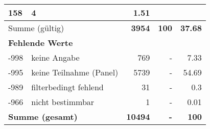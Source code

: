 \begin{longtable}{lXrrr}
       \num{158} &
       \num[round-mode=places,round-precision=2]{4} &
         \num[round-mode=places,round-precision=2]{1,51} \\
     \midrule
     \multicolumn{2}{l}{Summe (gültig)} &
       \textbf{\num{3954}} &
     \textbf{100} &
       \textbf{\num[round-mode=places,round-precision=2]{37,68}} \\
     \multicolumn{5}{l}{\textbf{Fehlende Werte}}\\
       -998 &
       keine Angabe &
         \num{769} &
        - &
         \num[round-mode=places,round-precision=2]{7,33} \\
       -995 &
       keine Teilnahme (Panel) &
         \num{5739} &
        - &
         \num[round-mode=places,round-precision=2]{54,69} \\
       -989 &
       filterbedingt fehlend &
         \num{31} &
        - &
         \num[round-mode=places,round-precision=2]{0,3} \\
       -966 &
       nicht bestimmbar &
         \num{1} &
        - &
         \num[round-mode=places,round-precision=2]{0,01} \\
     \midrule
     \multicolumn{2}{l}{\textbf{Summe (gesamt)}} &
          \textbf{\num{10494}} &
        \textbf{-} &
        \textbf{100} \\
     \bottomrule
     \end{longtable}
     
